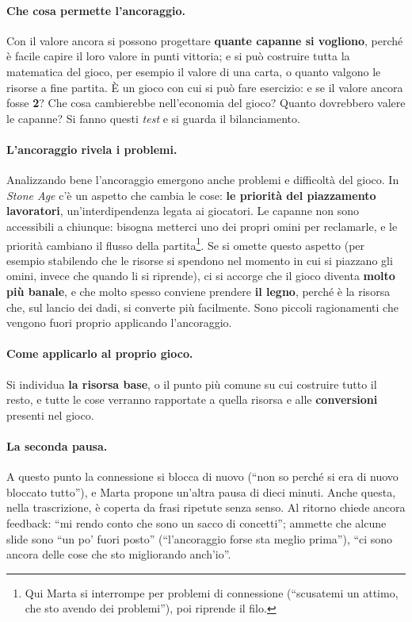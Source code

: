 \paragraph{Che cosa permette l'ancoraggio.} Con il valore ancora si possono progettare
\textbf{quante capanne si vogliono}, perché è facile capire il loro valore in punti vittoria; e
si può costruire tutta la matematica del gioco, per esempio il valore di una carta, o quanto
valgono le risorse a fine partita. È un gioco con cui si può fare esercizio: e se il valore
ancora fosse \textbf{2}? Che cosa cambierebbe nell'economia del gioco? Quanto dovrebbero valere
le capanne? Si fanno questi \emph{test} e si guarda il bilanciamento.

\paragraph{L'ancoraggio rivela i problemi.} Analizzando bene l'ancoraggio emergono anche problemi
e difficoltà del gioco. In \emph{Stone Age} c'è un aspetto che cambia le cose:
\textbf{le priorità del piazzamento lavoratori}, un'interdipendenza legata ai giocatori.
Le capanne non sono accessibili a chiunque: bisogna metterci uno dei propri omini per
reclamarle, e le priorità cambiano il flusso della partita\footnote{Qui Marta si interrompe
per problemi di connessione (``scusatemi un attimo, che sto avendo dei problemi''), poi
riprende il filo.}. Se si omette questo aspetto (per esempio stabilendo che le risorse si
spendono nel momento in cui si piazzano gli omini, invece che quando li si riprende), ci si
accorge che il gioco diventa \textbf{molto più banale}, e che molto spesso conviene prendere
\textbf{il legno}, perché è la risorsa che, sul lancio dei dadi, si converte più facilmente.
Sono piccoli ragionamenti che vengono fuori proprio applicando l'ancoraggio.

\paragraph{Come applicarlo al proprio gioco.} Si individua \textbf{la risorsa base}, o il
punto più comune su cui costruire tutto il resto, e tutte le cose verranno rapportate a quella
risorsa e alle \textbf{conversioni} presenti nel gioco.

\paragraph{La seconda pausa.} A questo punto la connessione si blocca di nuovo (``non so perché
si era di nuovo bloccato tutto''), e Marta propone un'altra pausa di dieci minuti. Anche questa,
nella trascrizione, è coperta da frasi ripetute senza senso. Al ritorno chiede ancora feedback:
``mi rendo conto che sono un sacco di concetti''; ammette che alcune slide sono ``un po' fuori
posto'' (``l'ancoraggio forse sta meglio prima''), ``ci sono ancora delle cose che sto
migliorando anch'io''.

